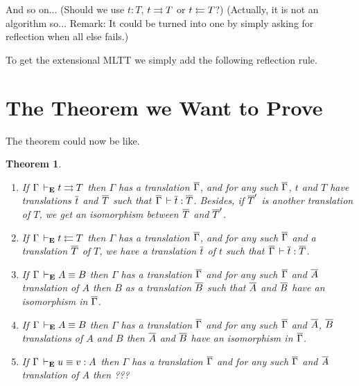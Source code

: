 \documentclass{amsart}
\newtheorem{theorem}{Theorem}[section]
\begin{document}
\begin{mathc}
\end{mathc}

\begin{mathc}
\end{mathc}
%
And so on... (Should we use $t : T$, $t \rightrightarrows T$ or $t \leftleftarrows T$?)
(Actually, it is not an algorithm so... Remark: It could be turned into one
by simply asking for reflection when all else fails.)

To get the extensional MLTT we simply add the following reflection rule.
%
\begin{mathc}
\end{mathc}


\section{The Theorem we Want to Prove}

The theorem could now be like.

\begin{theorem}
  \leavevmode
  \begin{enumerate}
    \item If $\Gamma \,\vdash_\mathbf{E} t \rightrightarrows T$ then $\Gamma$ has a translation $\overline{\Gamma}$,
    and for any such $\overline{\Gamma}$, $t$ and $T$ have translations $\overline{t}$ and $\overline{T}$
    such that $\overline{\Gamma} \,\vdash \overline{t} : \overline{T}$. Besides, if $\overline{T}'$ is another
    translation of $T$, we get an isomorphism between $\overline{T}$ and $\overline{T}'$.
    \item If $\Gamma \,\vdash_\mathbf{E} t \leftleftarrows T$ then $\Gamma$ has a translation $\overline{\Gamma}$,
    and for any such $\overline{\Gamma}$ and a translation $\overline{T}$ of $T$, we have a
    translation $\overline{t}$ of $t$ such that $\overline{\Gamma} \,\vdash \overline{t} : \overline{T}$.
    \item If $\Gamma \,\vdash_\mathbf{E} A \equiv B$ then $\Gamma$ has a translation $\overline{\Gamma}$
    and for any such $\overline{\Gamma}$ and $\overline{A}$ translation of $A$ then $B$ as a
    translation $\overline{B}$ such that $\overline{A}$ and $\overline{B}$ have an isomorphism in
    $\overline{\Gamma}$.
    \item If $\Gamma \,\vdash_\mathbf{E} A \equiv B$ then $\Gamma$ has a translation $\overline{\Gamma}$
    and for any such $\overline{\Gamma}$ and $\overline{A}$, $\overline{B}$ translations of $A$ and $B$
    then $\overline{A}$ and $\overline{B}$ have an isomorphism in $\overline{\Gamma}$.
    \item  If $\Gamma \,\vdash_\mathbf{E} u \equiv v : A$ then $\Gamma$ has a translation
    $\overline{\Gamma}$ and for any such $\overline{\Gamma}$ and $\overline{A}$ translation of $A$ then ???
  \end{enumerate}
\end{theorem}
\end{document}

